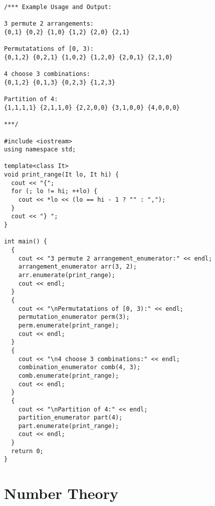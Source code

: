 \begin{lstlisting}
/*** Example Usage and Output:

3 permute 2 arrangements:
{0,1} {0,2} {1,0} {1,2} {2,0} {2,1}

Permutatations of [0, 3):
{0,1,2} {0,2,1} {1,0,2} {1,2,0} {2,0,1} {2,1,0}

4 choose 3 combinations:
{0,1,2} {0,1,3} {0,2,3} {1,2,3}

Partition of 4:
{1,1,1,1} {2,1,1,0} {2,2,0,0} {3,1,0,0} {4,0,0,0}

***/

#include <iostream>
using namespace std;

template<class It>
void print_range(It lo, It hi) {
  cout << "{";
  for (; lo != hi; ++lo) {
    cout << *lo << (lo == hi - 1 ? "" : ",");
  }
  cout << "} ";
}

int main() {
  {
    cout << "3 permute 2 arrangement_enumerator:" << endl;
    arrangement_enumerator arr(3, 2);
    arr.enumerate(print_range);
    cout << endl;
  }
  {
    cout << "\nPermutatations of [0, 3):" << endl;
    permutation_enumerator perm(3);
    perm.enumerate(print_range);
    cout << endl;
  }
  {
    cout << "\n4 choose 3 combinations:" << endl;
    combination_enumerator comb(4, 3);
    comb.enumerate(print_range);
    cout << endl;
  }
  {
    cout << "\nPartition of 4:" << endl;
    partition_enumerator part(4);
    part.enumerate(print_range);
    cout << endl;
  }
  return 0;
}
\end{lstlisting}

\section{Number Theory}
\setcounter{section}{3}
\setcounter{subsection}{0}
